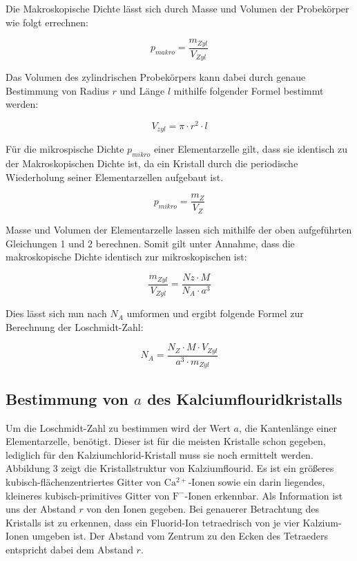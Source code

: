 \documentclass[12pt,a4paper,titlepage,headinclude,bibtotoc]{scrartcl}
\begin{document}
Die Makroskopische Dichte lässt sich durch  Masse und Volumen der Probekörper wie folgt errechnen:

\begin{equation}
p_{makro}= \frac{m_{Zyl}}{V_{Zyl}}
\end{equation}

Das Volumen des zylindrischen Probekörpers kann dabei durch genaue Bestimmung von Radius $r$ und Länge $l$ mithilfe folgender Formel bestimmt werden:

\begin{equation}
V_{zyl} = \pi \cdot r^{2} \cdot l
\end{equation}

Für die mikrospische Dichte $p_{mikro}$ einer Elementarzelle gilt, dass sie identisch zu der Makroskopischen Dichte ist, da ein Kristall durch die periodische Wiederholung seiner Elementarzellen aufgebaut ist.

\begin{equation}
p_{mikro}=\frac{m_Z}{V_Z}
\end{equation}

Masse und Volumen der Elementarzelle lassen sich mithilfe der oben aufgeführten Gleichungen 1 und 2 berechnen. Somit gilt unter Annahme, dass die makroskopische Dichte identisch zur mikroskopischen ist:

\begin{equation}
\frac{m_{Zyl}}{V_{Zyl}}= \frac{Nz \cdot M}{N_{A} \cdot a^3}
\end{equation}

Dies lässt sich nun nach $N_A$ umformen und ergibt folgende Formel zur Berechnung der Loschmidt-Zahl:

\begin{equation}
N_A= \frac{N_Z \cdot M \cdot V_{Zyl}}{a^3 \cdot m_{Zyl}}
\end{equation}

\subsection{Bestimmung von $a$ des Kalciumflouridkristalls}
 
Um die Loschmidt-Zahl zu bestimmen wird der Wert $a$, die Kantenlänge einer Elementarzelle, benötigt. Dieser ist für die meisten Kristalle schon gegeben, lediglich für den Kalziumchlorid-Kristall muss sie noch ermittelt werden. Abbildung 3 zeigt die Kristallstruktur von Kalziumflourid. Es ist ein größeres kubisch-flächenzentriertes Gitter von $ \mathrm {Ca^{2+}}$-Ionen sowie ein darin liegendes, kleineres kubisch-primitives Gitter von $ \mathrm{F^-}$-Ionen erkennbar. Als Information ist uns der Abstand $r$ von den Ionen gegeben. Bei genauerer Betrachtung des Kristalls ist zu erkennen, dass ein Fluorid-Ion tetraedrisch von je vier Kalzium-Ionen umgeben ist. Der Abstand vom Zentrum zu den Ecken des Tetraeders entspricht dabei dem Abstand $r$.
\end{document}
